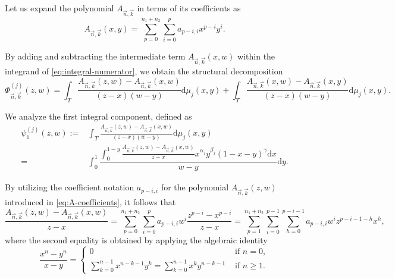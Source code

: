 \documentclass[11pt,reqno]{amsart}
\theoremstyle{definition}
\begin{document}
Let us expand the polynomial $A_{\vec n,\vec k}$ in terms of its coefficients as
\begin{equation}
    \label{eq:A-coefficients}
    A_{\vec n,\vec k}(x,y)=\sum_{p=0}^{n_1+n_2}\sum_{i=0}^p a_{p-i,i} x^{p-i} y^i.
\end{equation}

By adding and subtracting the intermediate term $A_{\vec n,\vec k}(x,w)$ within the integrand of \eqref{eq:integral-numerator}, we obtain the structural decomposition
\begin{equation}
    \label{eq:numerator-integrals}
    \Phi_{\vec n,\vec k}^{(j)}(z,w) =  \int_{T} \frac{A_{\vec n,\vec k}(z,w)-A_{\vec n,\vec k}(x,w)}{(z-x)(w-y)} \mathrm{d} \mu_j (x,y) + \int_{T} \frac{A_{\vec n,\vec k}(x,w)-A_{\vec n,\vec k}(x,y)}{(z-x)(w-y)} \mathrm{d} \mu_j (x,y).
\end{equation}

We analyze the first integral component, defined as
\begin{equation}
\label{eq:psi_1-1}
\begin{aligned}
    \psi_1^{(j)}(z,w):=&\int_{T} \frac{A_{\vec n,\vec k}(z,w)-A_{\vec n,\vec k}(x,w)}{(z-x)(w-y)} \mathrm{d} \mu_j (x,y)\\
    =&\int_{0}^{1}\dfrac{\int_0^{1-y}\frac{A_{\vec n,\vec k}(z,w)-A_{\vec n,\vec k}(x,w)}{z-x}x^{\alpha_j}y^{\beta_j}(1-x-y)^\gamma\mathrm{d} x}{w-y}\mathrm{d} y.
\end{aligned}
\end{equation}

By utilizing the coefficient notation $a_{p-i,i}$ for the polynomial $A_{\vec n,\vec k}(z,w)$ introduced in \eqref{eq:A-coefficients}, it follows that
\begin{equation*}
\frac{A_{\vec n,\vec k}(z,w) -A_{\vec n,\vec k}(x,w)}{z-x}= \sum_{p=0}^{n_1+n_2} 
\sum_{i=0}^{p} a_{p-i,i}  w^i \frac{z^{p-i}-x^{p-i} }{z-x}
= \sum_{p=1}^{n_1+n_2} 
\sum_{i=0}^{p-1} \sum_{h=0}^{p-i-1} a_{p-i,i}  w^i z^{p-i-1-h} x^h,
\end{equation*}
where the second equality is obtained by applying the algebraic identity
\begin{equation}
    \label{eq:polynomial-division}
    \frac{x^n-y^n}{x-y}=\begin{cases}
        0 & \text{ if } n=0,\\
        \displaystyle\sum_{k=0}^{n-1} x^{n-k-1}y^k=\sum_{k=0}^{n-1} x^ky^{n-k-1}& \text{ if } n\geq 1.
    \end{cases}
\end{equation}
\end{document}
